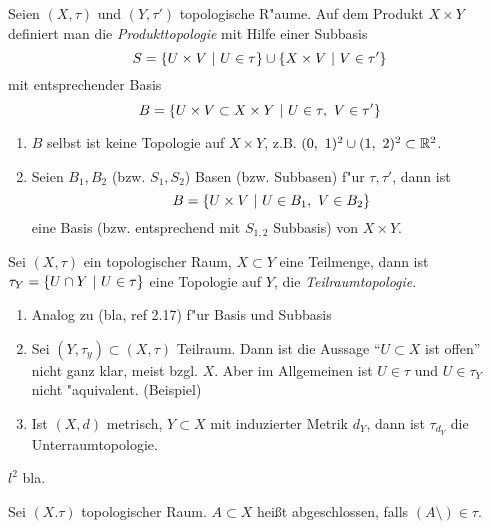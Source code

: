 \begin{dfn}
    Seien $(X,\tau)$ und $(Y, \tau')$ topologische R"aume. Auf dem Produkt
    $X\times Y$ definiert man die \emph{Produkttopologie} mit Hilfe einer
    Subbasis
    \[S = \mdef[U\times V]{U\in\tau} \cup \mdef[X\times V]{V\in\tau'}\]
    mit entsprechender Basis
    \[B = \mdef[U\times V \subset X\times Y]{U\in\tau,\ V\in\tau'}\]

    \begin{bem}
        \begin{enumerate}
         \item $B$ selbst ist keine Topologie auf $X\times Y$, z.B. $(0,\ 1)^2
            \cup (1,\ 2)^2 \subset \mathbb{R}^2$.
         \item Seien $B_1, B_2$ (bzw. $S_1, S_2$) Basen (bzw. Subbasen) f"ur
            $\tau,\tau'$, dann ist
            \[B = \mdef[U\times V]{U\in B_1,\ V\in B_2}\]
            eine Basis (bzw. entsprechend mit $S_{1,2}$ Subbasis) von $X\times Y$.
        \end{enumerate}
    \end{bem}
\end{dfn}

\begin{dfn}
    Sei $(X,\tau)$ ein topologischer Raum, $X\subset Y$ eine Teilmenge, dann ist
    $\tau_Y = \mdef[U\cap Y]{U\in\tau}$ eine Topologie auf $Y$, die
    \emph{Teilraumtopologie}.

    \begin{bem}
        \begin{enumerate}
         \item Analog zu (bla, ref 2.17) f"ur Basis und Subbasis
         \item Sei $(Y,\tau_y) \subset (X,\tau)$ Teilraum. Dann ist die Aussage
            "`$U\subset X$ ist offen"' nicht ganz klar, meist bzgl. $X$. Aber
            im Allgemeinen ist $U\in\tau$ und $U\in\tau_Y$ nicht "aquivalent.
            (Beispiel)
         \item Ist $(X,d)$ metrisch, $Y\subset X$ mit induzierter Metrik $d_Y$,
            dann ist $\tau_{d_Y}$ die Unterraumtopologie.
        \end{enumerate}
    \end{bem}
\end{dfn}

\begin{bsp}
    $l^2$ bla.
\end{bsp}

\begin{dfn}
    Sei $(X. \tau)$ topologischer Raum. $A\subset X$ hei\ss{}t abgeschlossen,
    falls $(A\setminus)\in\tau$.
\end{dfn}


